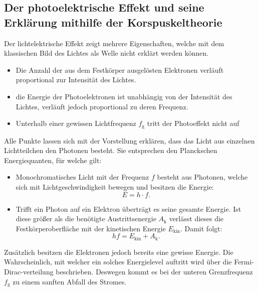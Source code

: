  \subsection{Der photoelektrische Effekt und seine Erklärung mithilfe der Korspuskeltheorie  }
 Der lichtelektrische Effekt zeigt mehrere Eigenschaften, welche mit dem
 klassischen Bild des Lichtes als Welle nicht erklärt werden können.
\begin{itemize}
  \item Die Anzahl der aus dem Festkörper ausgelösten Elektronen verläuft
  proportional zur Intensität des Lichtes.
  \item die Energie der Photoelektronen ist unabhängig von der Intensität des
  Lichtes, verläuft jedoch proportional zu deren Frequenz.
  \item Unterhalb einer gewissen Lichtfrequenz $f_\text{g}$ tritt der Photoeffekt nicht auf
\end{itemize}
Alle Punkte lassen sich mit der Vorstellung erklären, dass das Licht aus einzelnen
Lichtteilchen den Photonen besteht. Sie entsprechen den Planckschen Energiequanten,
für welche gilt:
\begin{itemize}
  \item Monochromatisches Licht mit der Frequenz $f$ besteht aus Photonen,
  welche sich mit Lichtgeschwindigkeit bewegen und besitzen die Energie:
  \begin{equation}
    E = h \cdot f\text{.}\label{ITSAPLANCK}
    \end{equation}
    \item Trifft ein Photon auf ein Elektron überträgt es seine gesamte Energie.
    Ist diese größer als die benötigte Austrittsenergie $A_\text{k}$ verlässt
    dieses die Festkörperoberfläche mit der kinetischen Energie $E_\text{kin}$.
    Damit folgt:
    \begin{equation}
      h f = E_\text{kin} +A_\text{k}\text{.}\label{STEVE0ne:---3}
    \end{equation}
\end{itemize}
Zusätzlich besitzen die Elektronen jedoch bereits eine gewisse Energie. Die Wahrscheinlich,
mit welcher ein solches Energielevel auftritt wird über die Fermi-Dirac-verteilung
beschrieben. Deswegen kommt es bei der unteren Grenzfrequenz $f_\text{g}$
zu einem sanften Abfall des Stromes.
